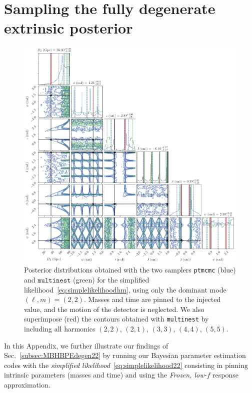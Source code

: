 \documentclass[aps,showpacs,twocolumn,prd,superscriptaddress,nofootinbib]{revtex4-1}
\begin{document}

\section{Sampling the fully degenerate extrinsic posterior}
\label{app:samplingdegen}

\begin{figure}
  \centering
  \includegraphics[width=.9\linewidth]{../plots/corner_smbh_case9_simplelike_ptmcmc_bambi.png}
  \caption{Posterior distributions obtained with the two samplers \texttt{ptmcmc} (blue) and $\texttt{multinest}$ (green) for the simplified likelihood~\eqref{eq:simplelikelihoodhm}, using only the dominant mode $(\ell, m) = (2,2)$. Masses and time are pinned to the injected value, and the motion of the detector is neglected. We also superimpose (red) the contours obtained with \texttt{multinest} by including all harmonics $(2,2)$, $(2,1)$, $(3,3)$, $(4,4)$, $(5,5)$.}
  \label{fig:PEsmbh22hmSimpleLikeCase9}
\end{figure}

In this Appendix, we further illustrate our findings of Sec.~\ref{subsec:MBHBPEdegen22} by running our Bayesian parameter estimation codes with the \textit{simplified likelihood}~\eqref{eq:simplelikelihood22} consisting in pinning intrinsic parameters (masses and time) and using the \textit{Frozen, low-$f$} response approximation.
\end{document}
